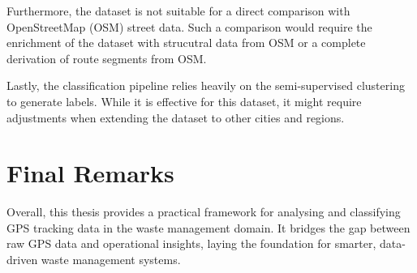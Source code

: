 \documentclass[a4paper,12pt,twoside]{scrreprt}
\begin{document}
Furthermore, the dataset is not suitable for a direct comparison with
OpenStreetMap (OSM) street data. Such a comparison would require the enrichment
of the dataset with strucutral data from OSM or a complete derivation of route
segments from OSM.

Lastly, the classification pipeline relies heavily on the semi-supervised
clustering
to generate labels. While it is effective for this dataset, it might require
adjustments
when extending the dataset to other cities and regions.

\section{Final Remarks}
Overall, this thesis provides a practical framework for analysing and
classifying GPS tracking data in the waste management domain. It bridges the
gap between raw GPS data and operational insights,
laying the foundation for smarter, data-driven waste management systems.

\clearpage
{}
{}
\printbibliography


\end{document}
